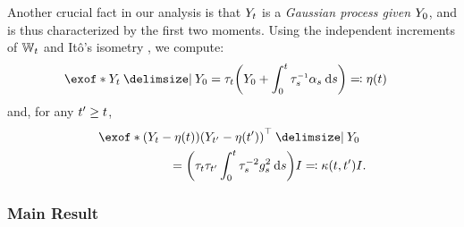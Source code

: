 Another crucial fact in our analysis is that $\refsde$ is a \emph{Gaussian process given $\refsde[0]$}, and is thus characterized by the first two moments. Using the independent increments of $\Wiener$ and It\^o's isometry \citep{protter2005stochastic}, we compute:
\begin{align}
\label{eq:mYdef}
\exof*{  \refsde \given \refsde[0]  } &= \aggtime  \parens*{\refsde[0] +  \int_0^\ctime {\aggtimeinv[\ctimealt]}{ \shift[\ctimealt] } \dd \ctimealt  } \eqdef \mYcinit  
\end{align}and, for any $\ctime' \geq \ctime$, 
\begin{align}
\label{eq:covYdef}
&\exof*{  \parens*{ \refsde - \mYcinit  } \parens*{ \refsde[\ctime']- \mYcinit[\ctime']   }^\top \given \refsde[0] } \\
&\hspace{20mm}= \parens*{\aggtime \aggtime[\ctime'] \intdasq} \eye \eqdef \kernel \eye.
\nn
\end{align}


\subsubsection{Main Result}
\label{sec:GaussianSB-main}

